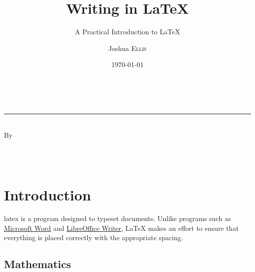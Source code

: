 \documentclass[twoside, onecolumn, bibliography=totoc, parskip=half*]{scrartcl}
\title{Writing in \texorpdfstring{\LaTeX}{LaTeX}}
\subtitle{A Practical Introduction to \texorpdfstring{\LaTeX}{LaTeX}}
\author{Joshua \scshape Ellis}
\date{\today}
\makeatletter
\newcommand{\@degreetitle}{}
\newcommand{\@department}{}
\newcommand{\@university}{}
\makeatother
\begin{document}

\pagestyle{empty}

\begin{titlepage}
  \makeatletter

  \begin{center}
    \vspace*{2.5cm}

    \Huge \textbf{\@title} \\[0em]
    \rule{\linewidth}{2pt}
    \huge \textsc{\@subtitle}\\[6em]

    \large By \\[1cm]
    \huge \@author \\[0.5ex]
    \Large \normalfont \@degreetitle

    \vfill

    \Large \@department \\[1ex]
    \Large \@university

    \vfill

    \large \@date
  \end{center}

\makeatother
\end{titlepage}

\cleardoublepage
\pagestyle{plain}

\tableofcontents

\cleardoublepage
\pagestyle{headings}

\section{Introduction}

\Gls{latex} is a program designed to typeset documents.  Unlike programs such as
\href{http://office.microsoft.com/en-au/word/}{Microsoft Word} and
\href{http://www.libreoffice.org/discover/writer/}{LibreOffice Writer}, LaTeX
makes an effort to ensure that everything is placed correctly with the
appropriate spacing.

\subsection{Mathematics}
\label{subsec:mathematics}
\end{document}
